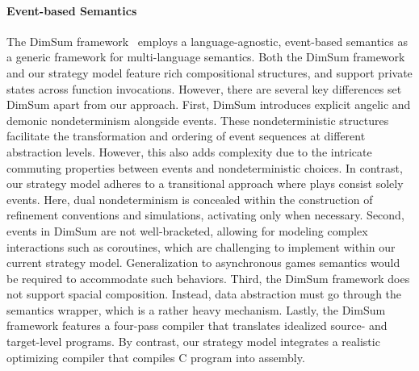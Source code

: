 \documentclass[acmsmall,screen,review,anonymous,nonacm]{acmart}
\begin{document}
\paragraph{Event-based Semantics}
The DimSum framework~\cite{dimsum}
employs a language-agnostic, event-based semantics
as a generic framework
for multi-language semantics.
Both the DimSum framework
and our strategy model
feature rich compositional structures,
and support private states
across function invocations.
However, there are several key differences
set DimSum apart
from our approach.
First,
DimSum introduces
explicit angelic and demonic nondeterminism
alongside events.
These nondeterministic structures
facilitate the transformation and ordering
of event sequences
at different abstraction levels.
However,
this also adds complexity
due to the intricate
commuting properties between events
and nondeterministic choices.
In contrast,
our strategy model
adheres to a transitional approach
where plays consist solely events.
Here, dual nondeterminism
is concealed within the construction of
refinement conventions and simulations,
activating only when necessary.
Second,
events in DimSum are not
well-bracketed,
allowing for modeling complex interactions
such as coroutines,
which are challenging to implement
within our current strategy model.
Generalization to
asynchronous games semantics
would be required to accommodate such behaviors.
Third,
the DimSum framework
does not support spacial composition.
Instead,
data abstraction must go through
the semantics wrapper,
which is a rather heavy mechanism.
Lastly,
the DimSum framework
features a four-pass compiler
that translates idealized source-
and target-level programs.
By contrast,
our strategy model
integrates a realistic optimizing compiler
that compiles C program into assembly.


%
%
%
\end{document}
